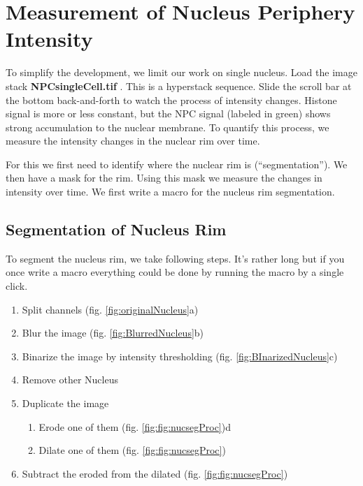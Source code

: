 \section{Measurement of Nucleus Periphery Intensity}

To simplify the development, we limit our work on single nucleus. Load the image stack \textbf{NPCsingleCell.tif} . This is a hyperstack sequence. Slide the scroll bar at the bottom back-and-forth to watch the process of intensity changes. Histone signal is more or less constant, but the NPC signal (labeled in green) shows strong accumulation to the nuclear membrane. To quantify this process, we measure the intensity changes in the nuclear rim over time.

For this we first need to identify where the nuclear rim is (``segmentation''). We then have a mask for the rim. Using this mask we measure the changes in intensity over time. We first write a macro for the nucleus rim segmentation.

\subsection{Segmentation of Nucleus Rim}

To segment the nucleus rim, we take following steps. It's rather long but if you once write a macro everything could be done by running the macro by a single click.

\begin{enumerate}
  \item Split channels (fig. \ref{fig:originalNucleus}a)
  \item Blur the image (fig. \ref{fig:BlurredNucleus}b)
  \item Binarize the image by intensity thresholding (fig. \ref{fig:BInarizedNucleus}c)
  \item Remove other Nucleus
  \item Duplicate the image
  \begin{enumerate}
    \item Erode one of them (fig. \ref{fig:fig:nucsegProc})d
    \item Dilate one of them (fig. \ref{fig:fig:nucsegProc})
  \end{enumerate}
  \item Subtract the eroded from the dilated (fig. \ref{fig:fig:nucsegProc})
\end{enumerate}